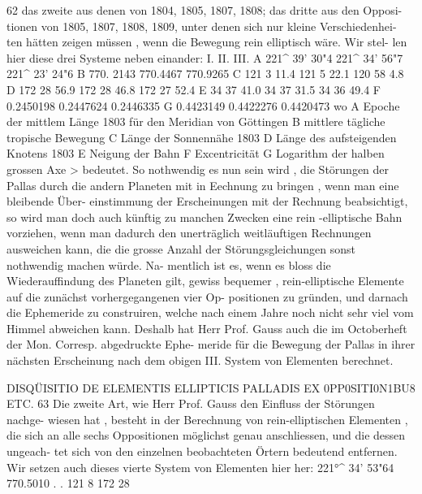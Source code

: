 \documentclass[12pt,a4paper]{article}
\begin{document}
\newpage

62
das  zweite  aus  denen  von  1804,  1805,  1807,  1808;  das  dritte  aus  den  Opposi-
tionen von  1805,  1807,  1808,  1809,  unter  denen  sich  nur  kleine  Verschiedenhei-
ten hätten  zeigen  müssen ,  wenn  die  Bewegung  rein  elliptisch  wäre.  Wir  stel-
len hier  diese  drei  Systeme  neben  einander:
I.
II.
III.
A
221\^{}  39'  30"4
221\^{}  34'  56"7
221\^{}  23'  24"6
B
770.  2143
770.4467
770.9265
C
121   3   11.4
121   5   22.1
120  58    4.8
D
172  28   56.9
172  28   46.8
172  27   52.4
E
34  37   41.0
34  37   31.5
34  36   49.4
F
0.2450198
0.2447624
0.2446335
G
0.4423149
0.4422276
0.4420473
wo
A  Epoche  der  mittlem  Länge  1803  für  den  Meridian  von  Göttingen
B  mittlere  tägliche  tropische  Bewegung
C  Länge  der  Sonnennähe  1803
D  Länge  des  aufsteigenden  Knotens  1803
E  Neigung  der  Bahn
F  Excentricität
G  Logarithm  der  halben  grossen  Axe  >
bedeutet.  So  nothwendig  es  nun  sein  wird ,  die  Störungen  der  Pallas  durch  die
andern  Planeten  mit  in  Eechnung  zu  bringen ,  wenn  man  eine  bleibende  Über-
einstimmung der  Erscheinungen  mit  der  Rechnung  beabsichtigt,  so  wird  man  doch
auch  künftig  zu  manchen  Zwecken  eine  rein -elliptische  Bahn  vorziehen,  wenn
man  dadurch  den  unerträglich  weitläuftigen  Rechnungen  ausweichen  kann,  die
die  grosse  Anzahl  der  Störungsgleichungen  sonst  nothwendig  machen  würde.  Na-
mentlich ist  es,  wenn  es  bloss  die  Wiederauffindung  des  Planeten  gilt,  gewiss
bequemer ,  rein-elliptische  Elemente  auf  die  zunächst  vorhergegangenen  vier  Op-
positionen zu  gründen,  und  darnach  die  Ephemeride  zu  construiren,  welche  nach
einem  Jahre  noch  nicht  sehr  viel  vom  Himmel  abweichen  kann.  Deshalb  hat
Herr  Prof.  Gauss  auch  die  im  Octoberheft  der  Mon.  Corresp.  abgedruckte  Ephe-
meride für  die  Bewegung  der  Pallas  in  ihrer  nächsten  Erscheinung  nach  dem
obigen  III.  System  von  Elementen  berechnet.

\newpage

DISQÜISITIO  DE  ELEMENTIS  ELLIPTICIS  PALLADIS  EX  0PP0SITI0N1BU8  ETC.
63
Die  zweite  Art,  wie  Herr  Prof.  Gauss  den  Einfluss  der  Störungen  nachge-
wiesen hat ,  besteht  in  der  Berechnung  von  rein-elliptischen  Elementen ,  die  sich
an  alle  sechs  Oppositionen  möglichst  genau  anschliessen,  und  die  dessen  ungeach-
tet sich  von  den  einzelnen  beobachteten  Örtern  bedeutend  entfernen.  Wir  setzen
auch  dieses  vierte  System  von  Elementen  hier  her:
221°\^{}  34'     53"64
770.5010
.      .  121       8
172     28
\end{document}
